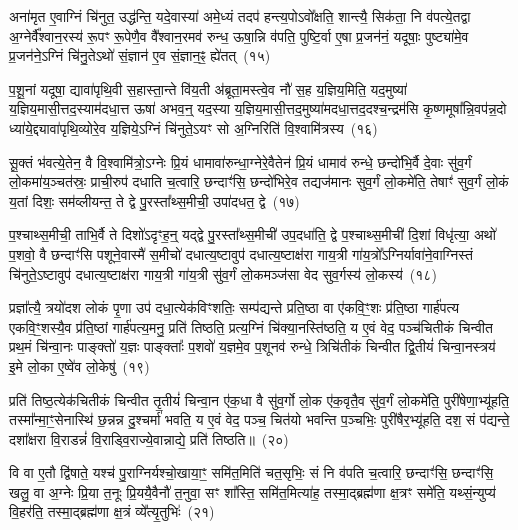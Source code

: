 अना॑मृत ए॒वाग्निं चि॑नुत॒ उद्ध॑न्ति॒ यदे॒वास्या॑ अमे॒ध्यं तदप॑ हन्त्य॒पो\-ऽवो᳚क्षति॒ शान्त्यै॒ सिक॑ता॒ नि व॑पत्ये॒तद्वा अ॒ग्नेर्वै᳚श्वान॒रस्य॑ रू॒पꣳ रू॒पेणै॒व वै᳚श्वान॒रमव॑ रुन्ध॒ ऊषा॒न्नि व॑पति॒ पुष्टि॒र्वा ए॒षा प्र॒जन॑नं॒ यदूषाः॒ पुष्ट्या॑मे॒व प्र॒जन॑ने॒\-ऽग्निं चि॑नु॒ते\-ऽथो॑ सं॒ज्ञान॑ ए॒व सं॒ज्ञान॒ꣴ॒ ह्ये॑तत्~(१५)

प॒शू॒नां यदूषा॒ द्यावा॑पृथि॒वी स॒हास्ता॒न्ते वि॑य॒ती अ॑ब्रूता॒मस्त्वे॒व नौ॑ स॒ह य॒ज्ञिय॒मिति॒ यद॒मुष्या॑ य॒ज्ञिय॒मासी॒त्तद॒स्याम॑दधा॒त्त ऊषा॑ अभव॒न्॒ यद॒स्या य॒ज्ञिय॒मासी॒त्तद॒मुष्या॑मदधा॒त्तद॒दश्च॒न्द्रम॑सि कृ॒ष्णमूषा᳚न्नि॒वप॑न्न॒दो ध्या॑ये॒द्द्यावा॑पृथि॒व्योरे॒व य॒ज्ञिये॒\-ऽग्निं चि॑नुते॒\-ऽयꣳ सो अ॒ग्निरिति॑ वि॒श्वामि॑त्रस्य~(१६)

सू॒क्तं भ॑वत्ये॒तेन॒ वै वि॒श्वामि॑त्रो॒\-ऽग्नेः प्रि॒यं धामावा॑रुन्धा॒ग्नेरे॒वैतेन॑ प्रि॒यं धामाव॑ रुन्धे॒ छन्दो॑भि॒र्वै दे॒वाः सु॑व॒र्गं लो॒कमा॑य॒ञ्चत॑स्रः॒ प्राची॒रुप॑ दधाति च॒त्वारि॒ छन्दाꣳ॑सि॒ छन्दो॑भिरे॒व तद्यज॑मानः सुव॒र्गं लो॒कमे॑ति॒ तेषाꣳ॑ सुव॒र्गं लो॒कं य॒तां दिशः॒ सम॑व्लीयन्त॒ ते द्वे पु॒रस्ता᳚थ्स॒मीची॒ उपा॑दधत॒ द्वे~(१७)

प॒श्चाथ्स॒मीची॒ ताभि॒र्वै ते दिशो॑\-ऽदृꣳह॒न्॒ यद्द्वे पु॒रस्ता᳚थ्स॒मीची॑ उप॒दधा॑ति॒ द्वे प॒श्चाथ्स॒मीची॑ दि॒शां विधृ॑त्या॒ अथो॑ प॒शवो॒ वै छन्दाꣳ॑सि पशूने॒वास्मै॑ स॒मीचो॑ दधात्य॒ष्टावुप॑ दधात्य॒ष्टाक्ष॑रा गाय॒त्री गा॑य॒त्रो᳚\-ऽग्निर्यावा॑ने॒वाग्निस्तं चि॑नुते॒\-ऽष्टावुप॑ दधात्य॒ष्टाक्ष॑रा गाय॒त्री गा॑य॒त्री सु॑व॒र्गं लो॒कमञ्ज॑सा वेद सुव॒र्गस्य॑ लो॒कस्य॑~(१८)

प्रज्ञा᳚त्यै॒ त्रयो॑दश लोकं पृ॒णा उप॑ दधा॒त्येक॑विꣳशतिः॒ सम्प॑द्यन्ते प्रति॒ष्ठा वा ए॑कवि॒ꣳ॒शः प्र॑ति॒ष्ठा गार्\mbox{}ह॑पत्य एकवि॒ꣳ॒शस्यै॒व प्र॑ति॒ष्ठां गार्\mbox{}ह॑पत्य॒मनु॒ प्रति॑ तिष्ठति॒ प्रत्य॒ग्निं चि॑क्या॒नस्ति॑ष्ठति॒ य ए॒वं वेद॒ पञ्च॑चितीकं चिन्वीत प्रथ॒मं चि॑न्वा॒नः पाङ्क्तो॑ य॒ज्ञः पाङ्क्ताः᳚ प॒शवो॑ य॒ज्ञमे॒व प॒शूनव॑ रुन्धे॒ त्रिचि॑तीकं चिन्वीत द्वि॒तीयं॑ चिन्वा॒नस्त्रय॑ इ॒मे लो॒का ए॒ष्वे॑व लो॒केषु॑~(१९)

प्रति॑ तिष्ठ॒त्येक॑चितीकं चिन्वीत तृ॒तीयं॑ चिन्वा॒न ए॑क॒धा वै सु॑व॒र्गो लो॒क ए॑क॒वृतै॒व सु॑व॒र्गं लो॒कमे॑ति॒ पुरी॑षेणा॒भ्यू॑हति॒ तस्मा᳚न्मा॒ꣳ॒सेनास्थि॑ छ॒न्नन्न दु॒श्चर्मा॑ भवति॒ य ए॒वं वेद॒ पञ्च॒ चित॑यो भवन्ति प॒ञ्चभिः॒ पुरी॑षैर॒भ्यू॑हति॒ दश॒ सं प॑द्यन्ते॒ दशा᳚क्षरा वि॒राडन्नं॑ वि॒राड्वि॒राज्ये॒वान्नाद्ये॒ प्रति॑ तिष्ठति॥~(२०)

{}%

वि वा ए॒तौ द्वि॑षाते॒ यश्च॑ पु॒राग्निर्यश्चो॒खाया॒ꣳ॒ समि॑त॒मिति॑ चत॒सृभिः॒ सं नि व॑पति च॒त्वारि॒ छन्दाꣳ॑सि॒ छन्दाꣳ॑सि॒ खलु॒ वा अ॒ग्नेः प्रि॒या त॒नूः प्रि॒ययै॒वैनौ॑ त॒नुवा॒ सꣳ शा᳚स्ति॒ समि॑त॒मित्या॑ह॒ तस्मा॒द्ब्रह्म॑णा क्ष॒त्रꣳ समे॑ति॒ यथ्सं॒न्युप्य॑ वि॒हर॑ति॒ तस्मा॒द्ब्रह्म॑णा क्ष॒त्रं व्ये᳚त्यृ॒तुभिः॑~(२१)

